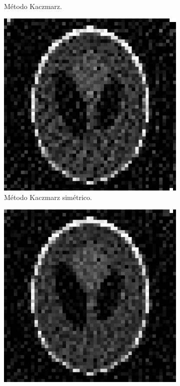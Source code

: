 \documentclass[letterpaper,12pt]{article}
\theoremstyle{plain}
\begin{document}
\begin{figure}[H]
\begin{subfigure}[h]{0.32\linewidth}
           \caption{Método Kaczmarz.} 
           \label{fig:noise_ramp}
        \end{subfigure}
        \begin{subfigure}[h]{0.32\linewidth}
           \centering
           \includegraphics[width=\textwidth]{Figuras/Kaczmarz_sym.png}
           \caption{Método Kaczmarz simétrico.}
           \label{fig:noise_shepp}
        \end{subfigure}
        \begin{subfigure}[h]{0.32\linewidth}
            \centering
            \includegraphics[width=\textwidth]{Figuras/Kaczmarz_random.png}

\end{subfigure}
\end{figure}
\end{document}
